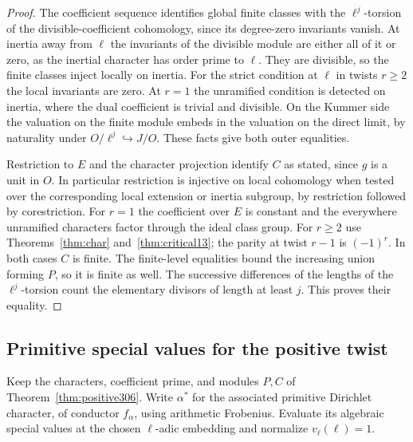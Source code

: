 \documentclass[a4paper,11pt]{article}
\theoremstyle{definition}
\theoremstyle{remark}
\numberwithin{equation}{section}
\begin{document}
\begin{proof}
The coefficient sequence identifies global finite classes with
the \(\ell^j\)-torsion of the divisible-coefficient cohomology,
since its degree-zero invariants vanish. At inertia away from
\(\ell\) the invariants of the divisible module are either all
of it or zero, as the inertial character has order prime to
\(\ell\). They are divisible, so the finite classes inject
locally on inertia. For the strict condition at \(\ell\) in
twists \(r\ge2\) the local invariants are zero. At \(r=1\)
the unramified condition is detected on inertia, where the
dual coefficient is trivial and divisible. On the Kummer side
the valuation on the finite module embeds in the valuation on
the direct limit, by naturality under
\(O/\ell^j\hookrightarrow J/O\). These facts give both outer
equalities.

Restriction to \(E\) and the character projection identify
\(C\) as stated, since \(g\) is a unit in \(O\). In particular
restriction is injective on local cohomology when tested over
the corresponding local extension or inertia subgroup, by
restriction followed by corestriction.
For \(r=1\) the coefficient over \(E\) is constant and the
everywhere unramified characters factor through the ideal
class group. For \(r\ge2\) use Theorems~\ref{thm:char}
and~\ref{thm:critical13}; the parity at twist \(r-1\) is
\((-1)^r\). In both cases \(C\) is finite. The finite-level
equalities bound the increasing union forming \(P\), so it is
finite as well. The successive differences of the lengths of
the \(\ell^j\)-torsion count the elementary divisors of length
at least \(j\). This proves their equality.
\end{proof}

\subsection{Primitive special values for the positive twist}\label{nav:II-72}
Keep the characters, coefficient prime, and modules \(P,C\)
of Theorem~\ref{thm:positive306}. Write \(\alpha^*\) for
the associated primitive Dirichlet character, of conductor
\(f_\alpha\), using arithmetic Frobenius. Evaluate its
algebraic special values at the chosen \(\ell\)-adic embedding
and normalize \(v_\ell(\ell)=1\).
\end{document}
